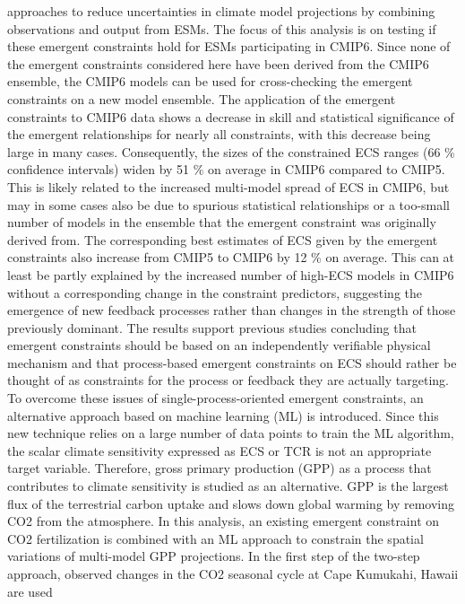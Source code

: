 {  approaches to reduce uncertainties in climate model projections by combining
  observations and output from ESMs. The focus of this analysis is on testing
  if these emergent constraints hold for ESMs participating in CMIP6. Since
  none of the emergent constraints considered here have been derived from the
  CMIP6 ensemble, the CMIP6 models can be used for cross-checking the emergent
  constraints on a new model ensemble. The application of the emergent
  constraints to CMIP6 data shows a decrease in skill and statistical
  significance of the emergent relationships for nearly all constraints, with
  this decrease being large in many cases. Consequently, the sizes of the
  constrained ECS ranges (66 \% confidence intervals) widen by 51 \% on average
  in CMIP6 compared to CMIP5. This is likely related to the increased
  multi-model spread of ECS in CMIP6, but may in some cases also be due to
  spurious statistical relationships or a too-small number of models in the
  ensemble that the emergent constraint was originally derived from. The
  corresponding best estimates of ECS given by the emergent constraints also
  increase from CMIP5 to CMIP6 by 12 \% on average. This can at least be partly
  explained by the increased number of high-ECS models in CMIP6 without a
  corresponding change in the constraint predictors, suggesting the emergence
  of new feedback processes rather than changes in the strength of those
  previously dominant. The results support previous studies concluding that
  emergent constraints should be based on an independently verifiable physical
  mechanism and that process-based emergent constraints on ECS should rather be
  thought of as constraints for the process or feedback they are actually
  targeting. To overcome these issues of single-process-oriented emergent
  constraints, an alternative approach based on machine learning (ML) is
  introduced. Since this new technique relies on a large number of data points
  to train the ML algorithm, the scalar climate sensitivity expressed as ECS or
  TCR is not an appropriate target variable. Therefore, gross primary
  production (GPP) as a process that contributes to climate sensitivity is
  studied as an alternative. GPP is the largest flux of the terrestrial carbon
  uptake and slows down global warming by removing CO2 from the atmosphere. In
  this analysis, an existing emergent constraint on CO2 fertilization is
  combined with an ML approach to constrain the spatial variations of
  multi-model GPP projections. In the first step of the two-step approach,
  observed changes in the CO2 seasonal cycle at Cape Kumukahi, Hawaii are used
}
